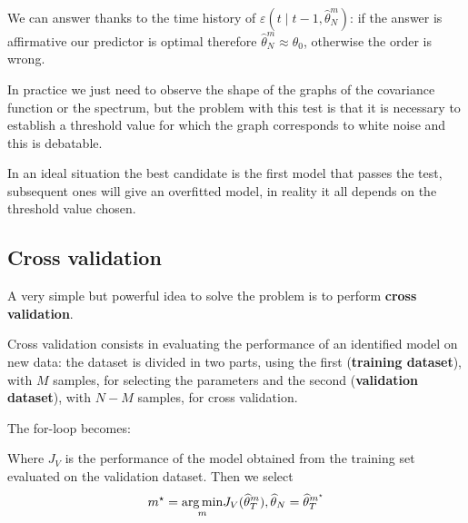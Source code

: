 We can answer thanks to the time history of $\varepsilon(t\mid t-1,\hat\theta_N^m)$: if the answer is affirmative our predictor is optimal therefore $\hat\theta_N^m\approx\theta_0$, otherwise the order is wrong.

In practice we just need to observe the shape of the graphs of the covariance function or the spectrum, but the problem with this test is that it is necessary to establish a threshold value for which the graph corresponds to white noise and this is debatable.


In an ideal situation the best candidate is the first model that passes the test, subsequent ones will give an overfitted model, in reality it all depends on the threshold value chosen.


\subsection{Cross validation}

A very simple but powerful idea to solve the problem is to perform \textbf{cross validation}.

Cross validation consists in evaluating the performance of an identified model on new data: the dataset is divided in two parts, using the first (\textbf{training dataset}), with $M$ samples, for selecting the parameters and the second (\textbf{validation dataset}), with $N-M$ samples, for cross validation.

The for-loop becomes:


Where $ J_{V}$ is the performance of the model obtained from the training set evaluated on the validation dataset. Then we select
\begin{equation*}
m^{\star} =\underset{m}{\operatorname*{arg\,min}} J_{V}(\widehat{\theta }_{T}^{m}) ,\widehat{\theta }_{N} =\widehat{\theta }_{T}^{m^{\star}}
\end{equation*}

